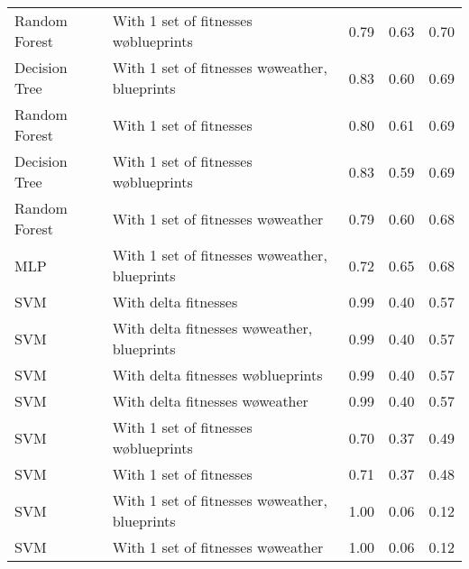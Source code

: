 \begin{tabular}{llrrr}
 Random Forest &          With 1 set of fitnesses w\o blueprints &       0.79 &    0.63 & 0.70 \\
 Decision Tree & With 1 set of fitnesses w\o weather, blueprints &       0.83 &    0.60 & 0.69 \\
 Random Forest &                         With 1 set of fitnesses &       0.80 &    0.61 & 0.69 \\
 Decision Tree &          With 1 set of fitnesses w\o blueprints &       0.83 &    0.59 & 0.69 \\
 Random Forest &             With 1 set of fitnesses w\o weather &       0.79 &    0.60 & 0.68 \\
           MLP & With 1 set of fitnesses w\o weather, blueprints &       0.72 &    0.65 & 0.68 \\
           SVM &                            With delta fitnesses &       0.99 &    0.40 & 0.57 \\
           SVM &    With delta fitnesses w\o weather, blueprints &       0.99 &    0.40 & 0.57 \\
           SVM &             With delta fitnesses w\o blueprints &       0.99 &    0.40 & 0.57 \\
           SVM &                With delta fitnesses w\o weather &       0.99 &    0.40 & 0.57 \\
           SVM &          With 1 set of fitnesses w\o blueprints &       0.70 &    0.37 & 0.49 \\
           SVM &                         With 1 set of fitnesses &       0.71 &    0.37 & 0.48 \\
           SVM & With 1 set of fitnesses w\o weather, blueprints &       1.00 &    0.06 & 0.12 \\
           SVM &             With 1 set of fitnesses w\o weather &       1.00 &    0.06 & 0.12 \\
\bottomrule
\end{tabular}
